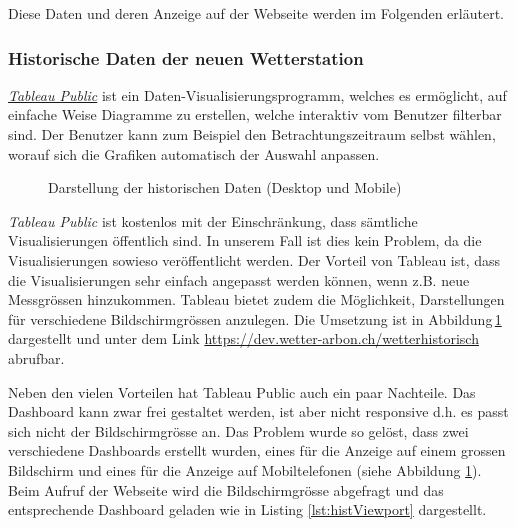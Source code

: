 \noindent
Diese Daten und deren Anzeige auf der Webseite werden im Folgenden erläutert.

\subsubsection{Historische Daten der neuen Wetterstation}
\label{kap:Tableau}
 \href{https://public.tableau.com/de-de/s/}{\emph{Tableau Public}} ist ein Daten-Visualisierungsprogramm, welches es ermöglicht, auf einfache Weise Diagramme zu erstellen, welche interaktiv vom Benutzer filterbar sind. Der Benutzer kann zum Beispiel den Betrachtungszeitraum selbst wählen, worauf sich die Grafiken automatisch der Auswahl anpassen.

\begin{figure}[h!]
	\centering
	\caption{Darstellung der historischen Daten (Desktop und Mobile)}
	\label{img:tableau}
\end{figure}


\noindent
\emph{Tableau Public} ist kostenlos mit der Einschränkung, dass sämtliche Visualisierungen öffentlich sind. In unserem Fall ist dies kein Problem, da die Visualisierungen sowieso veröffentlicht werden. Der Vorteil von Tableau ist, dass die Visualisierungen sehr einfach angepasst werden können, wenn z.B. neue Messgrössen hinzukommen. Tableau bietet zudem die Möglichkeit, Darstellungen für verschiedene Bildschirmgrössen anzulegen. Die Umsetzung ist in Abbildung\,\ref{img:tableau} dargestellt und unter dem Link \url{https://dev.wetter-arbon.ch/wetterhistorisch} abrufbar.

Neben den vielen Vorteilen hat Tableau Public auch ein paar Nachteile. Das Dashboard kann zwar frei gestaltet werden, ist aber nicht responsive d.h. es passt sich nicht der Bildschirmgrösse an. Das Problem wurde so gelöst, dass zwei verschiedene Dashboards erstellt wurden, eines für die Anzeige auf einem grossen Bildschirm und eines für die Anzeige auf Mobiltelefonen (siehe Abbildung \ref{img:tableau}). Beim Aufruf der Webseite wird die Bildschirmgrösse abgefragt und das entsprechende Dashboard geladen wie in Listing \ref{lst:histViewport} dargestellt.

